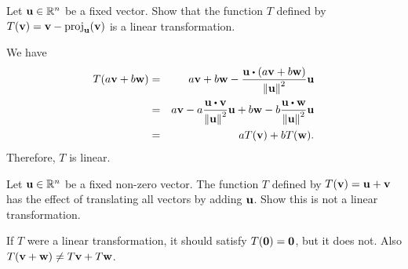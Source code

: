 \begin{ex}
  Let $\vect{u}\in\R^n$ be a fixed vector.  Show that the function $T$
  defined by
  $T(\vect{v}) = \vect{v}-\proj_{\vect{u}}(\vect{v})$ is a
  linear transformation.
  \begin{sol}
    We have
    \begin{eqnarray*}
      T(a\vect{v}+b\vect{w})
      &=& a\vect{v}+b\vect{w}
          -\frac{\vect{u}\dotprod(a\vect{v}+b\vect{w})}{\norm{\vect{u}}^{2}}
          \vect{u} \\
      &=& a\vect{v}
          -a\frac{\vect{u}\dotprod\vect{v}}{\norm{\vect{u}}^{2}}\vect{u}
          +b\vect{w}
          -b\frac{\vect{u}\dotprod\vect{w}}{\norm{\vect{u}}^{2}}\vect{u} \\
      &=& aT(\vect{v}) +bT(\vect{w}).
    \end{eqnarray*}
    Therefore, $T$ is linear.
  \end{sol}
\end{ex}

\begin{ex}
  Let $\vect{u}\in\R^n$ be a fixed non-zero vector. The function $T$
  defined by $T(\vect{v})=\vect{u}+\vect{v}$ has the effect of
  translating all vectors by adding $\vect{u}$. Show this is not a
  linear transformation.
  \begin{sol}
    If $T$ were a linear transformation, it should satisfy
    $T(\vect{0}) = \vect{0}$, but it does not. Also
    $T(\vect{v}+\vect{w}) \neq T\vect{v}+T\vect{w}$.
  \end{sol}
\end{ex}

